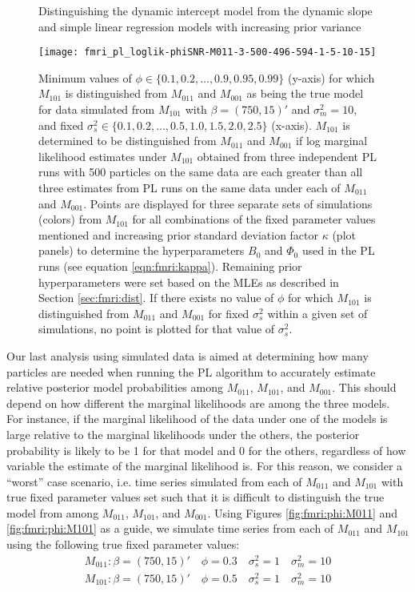 \begin{figure}
\ssp
\centering
\caption{Distinguishing the dynamic intercept model from the dynamic slope and simple linear regression models with increasing prior variance} \label{fig:fmri:kappa:M101}
\texttt{[image: fmri\_pl\_loglik-phiSNR-M011-3-500-496-594-1-5-10-15]}
\caption*{Minimum values of $\phi \in \{0.1,0.2,\ldots,0.9,0.95,0.99\}$ (y-axis) for which $M_{101}$ is distinguished from $M_{011}$ and $M_{001}$ as being the true model for data simulated from $M_{101}$ with $\beta = (750,15)'$ and $\sigma^2_m = 10$, and fixed $\sigma^2_s \in \{0.1,0.2,\ldots,0.5,1.0,1.5,2.0,2.5\}$ (x-axis). $M_{101}$ is determined to be distinguished from $M_{011}$ and $M_{001}$ if log marginal likelihood estimates under $M_{101}$ obtained from three independent PL runs with 500 particles on the same data are each greater than all three estimates from PL runs on the same data under each of $M_{011}$ and $M_{001}$. Points are displayed for three separate sets of simulations (colors) from $M_{101}$ for all combinations of the fixed parameter values mentioned and increasing prior standard deviation factor $\kappa$ (plot panels) to determine the hyperparameters $B_0$ and $\Phi_0$ used in the PL runs (see equation \eqref{eqn:fmri:kappa}). Remaining prior hyperparameters were set based on the MLEs as described in Section \ref{sec:fmri:dist}. If there exists no value of $\phi$ for which $M_{101}$ is distinguished from $M_{011}$ and $M_{001}$ for fixed $\sigma^2_s$ within a given set of simulations, no point is plotted for that value of $\sigma^2_s$.}
\end{figure}

Our last analysis using simulated data is aimed at determining how many particles are needed when running the PL algorithm to accurately estimate relative posterior model probabilities among $M_{011}$, $M_{101}$, and $M_{001}$. This should depend on how different the marginal likelihoods are among the three models. For instance, if the marginal likelihood of the data under one of the models is large relative to the marginal likelihoods under the others, the posterior probability is likely to be 1 for that model and 0 for the others, regardless of how variable the estimate of the marginal likelihood is. For this reason, we consider a ``worst'' case scenario, i.e. time series simulated from each of $M_{011}$ and $M_{101}$ with true fixed parameter values set such that it is difficult to distinguish the true model from among $M_{011}$, $M_{101}$, and $M_{001}$. Using Figures \ref{fig:fmri:phi:M011} and \ref{fig:fmri:phi:M101} as a guide, we simulate time series from each of $M_{011}$ and $M_{101}$ using the following true fixed parameter values:
\begin{align}
M_{011}: \beta = (750,15)' \quad \phi = 0.3 \quad \sigma^2_s = 1 \quad \sigma^2_m = 10 \label{eqn:fmri:sim:M011} \\
M_{101}: \beta = (750,15)' \quad \phi = 0.5 \quad \sigma^2_s = 1 \quad \sigma^2_m = 10 \label{eqn:fmri:sim:M101}
\end{align}

